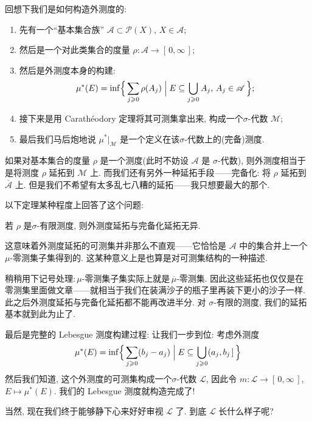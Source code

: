 回想下我们是如何构造外测度的:
\begin{enumerate}
    \item 先有一个``基本集合族'' $\mathscr A\subset\mathcal P(X)$, $X\in\mathscr A$;
    \item 然后是一个对此类集合的度量 $\rho :\mathscr A\to [\,0,\infty\,]$;
    \item 然后是外测度本身的构建: \[\mu^*(E) = \inf\Bigl\{ \,\sum_{j\geqslant 0}\rho (A_j)\Bigm| E\subseteq\bigcup_{j\geqslant 0}A_j,\,A_j\in\mathscr A\, \Bigr\};\]
    \item 接下来是用 Carathéodory 定理将其可测集拿出来, 构成一个\;$\sigma $-代数 $\mathcal M$;
    \item 最后我们马后炮地说 $\mu^*|_{\mathcal M}$ 是一个定义在该\;$\sigma $-代数上的(完备)测度.
\end{enumerate}
如果对基本集合的度量 $\rho $ 是一个测度(此时不妨设 $\mathscr A$ 是 $\sigma$-代数), 则外测度相当于是将测度 $\rho$ 延拓到 $\mathcal M$ 上. 而我们还有另外一种延拓手段------完备化: 将 $\rho $ 延拓到 $\overline{\mathscr A}$ 上. 但是我们不希望有太多乱七八糟的延拓------我只想要最大的那个.

以下定理某种程度上回答了这个问题:
\begin{theorem}
    若 $\rho $ 是\;$\sigma $-有限测度, 则外测度延拓与完备化延拓无异.
\end{theorem}
这意味着外测度延拓的可测集并非那么不直观------它恰恰是 $\mathscr A$ 中的集合并上一个\;$\mu $-零测集子集得到的. 这某种意义上是也算是对可测集结构的一种描述.

稍稍用下记号处理:\,\;$\mu $-零测集子集实际上就是\,$\overline{\mu }$-零测集. 因此这些延拓也仅仅是在零测集里面做文章------就相当于我们在装满沙子的瓶子里再装下更小的沙子一样. 此之后外测度延拓与完备化延拓都不能再改进半分. 对 $\sigma$-有限的测度, 我们的延拓基本就到此为止了.

最后是完整的 Lebesgue 测度构建过程: 让我们一步到位: 考虑外测度
\[
    \mu ^*(E) = \inf\Bigl\{ \,\sum_{j\geqslant 0}(b_j-a_j)\Bigm| E\subseteq\bigcup_{j\geqslant 0}(a_j,b_j\,]\, \Bigr\}
\]
然后我们知道, 这个外测度的可测集构成一个\;$\sigma $-代数 $\mathcal L$, 因此令 $m:\mathcal L\to [\,0,\infty\,]$, $E\mapsto \mu ^*(E)$. 我们的 Lebesgue 测度就构造完成了!

当然, 现在我们终于能够静下心来好好审视 $\mathcal L$ 了. 到底 $\mathcal L$ 长什么样子呢?

